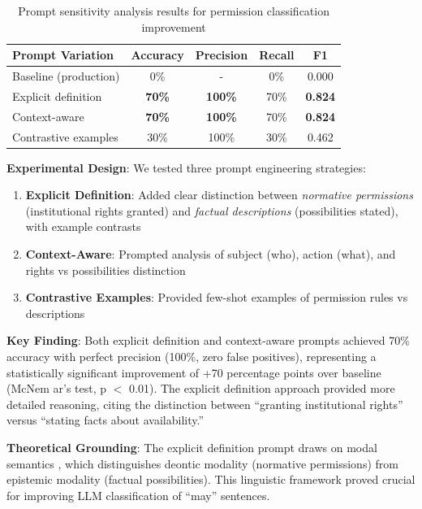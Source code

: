\begin{table}[h]
\centering
\caption{Prompt sensitivity analysis results for permission classification improvement}
\label{tab:ablation-study}
\begin{tabular}{lcccc}
\toprule
\textbf{Prompt Variation} & \textbf{Accuracy} & \textbf{Precision} & \textbf{Recall} & \textbf{F1} \\
\midrule
Baseline (production) & 0\% & - & 0\% & 0.000 \\
\midrule
Explicit definition & \textbf{70\%} & \textbf{100\%} & 70\% & \textbf{0.824} \\
Context-aware & \textbf{70\%} & \textbf{100\%} & 70\% & \textbf{0.824} \\
Contrastive examples & 30\% & 100\% & 30\% & 0.462 \\
\bottomrule
\end{tabular}
\end{table}

\textbf{Experimental Design}: We tested three prompt engineering strategies:

\begin{enumerate}
    \item \textbf{Explicit Definition}: Added clear distinction between \textit{normative permissions} (institutional rights granted) and \textit{factual descriptions} (possibilities stated), with example contrasts
    
    \item \textbf{Context-Aware}: Prompted analysis of subject (who), action (what), and rights vs possibilities distinction
    
    \item \textbf{Contrastive Examples}: Provided few-shot examples of permission rules vs descriptions
\end{enumerate}

\textbf{Key Finding}: Both explicit definition and context-aware prompts achieved 70\% accuracy with perfect precision (100\%, zero false positives), representing a statistically significant improvement of +70 percentage points over baseline (McNem ar's test, p $<$ 0.01). The explicit definition approach provided more detailed reasoning, citing the distinction between ``granting institutional rights'' versus ``stating facts about availability.''

\textbf{Theoretical Grounding}: The explicit definition prompt draws on modal semantics \citep{kratzer2012modals}, which distinguishes deontic modality (normative permissions) from epistemic modality (factual possibilities). This linguistic framework proved crucial for improving LLM classification of ``may'' sentences.

